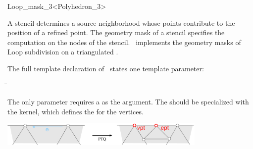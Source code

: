 \begin{ccRefClass}{Loop_mask_3<Polyhedron_3>}

\ccDefinition

A stencil determines a source neighborhood 
whose points contribute to the position of a refined point.
The geometry mask of a stencil specifies
the computation on the nodes of the stencil.
\ccClassTemplateName\ implements the geometry masks of 
Loop subdivision on a triangulated .


\ccParameters

The full template declaration of \ccClassTemplateName\ states one
template parameter:

\begin{tabbing}
 \= 
\end{tabbing}
   
The only parameter requires a  as the argument. The
 should be specialized with the 
kernel, which defines the  for the vertices.

\ccCreation
{}


\ccThreeToTwo




\begin{ccTexOnly}
  \begin{center}
    \parbox{0.75\textwidth}{%
      \includegraphics[width=0.75\textwidth]{Subdivision_method_3_ref/FIG/LoopBorderMask}%
    }
  \end{center}
\end{ccTexOnly}


\end{ccRefClass}
